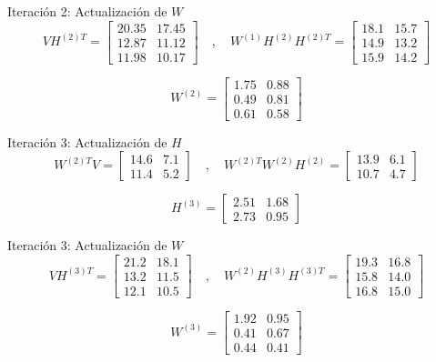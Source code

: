 \documentclass{beamer}
\begin{document}
\begin{frame}{Iteración 2: Actualización de \( W \)}
\[
V H^{(2)T} = \begin{bmatrix}
20.35 & 17.45 \\
12.87 & 11.12 \\
11.98 & 10.17
\end{bmatrix}
\quad , \quad
W^{(1)} H^{(2)} H^{(2)T} = \begin{bmatrix}
18.1 & 15.7 \\
14.9 & 13.2 \\
15.9 & 14.2
\end{bmatrix}
\]

\[
W^{(2)} = \begin{bmatrix}
1.75 & 0.88 \\
0.49 & 0.81 \\
0.61 & 0.58
\end{bmatrix}
\]
\end{frame}

\begin{frame}{Iteración 3: Actualización de \( H \)}
\[
W^{(2)T} V = \begin{bmatrix}
14.6 & 7.1 \\
11.4 & 5.2
\end{bmatrix}
\quad , \quad
W^{(2)T} W^{(2)} H^{(2)} = \begin{bmatrix}
13.9 & 6.1 \\
10.7 & 4.7
\end{bmatrix}
\]

\[
H^{(3)} = \begin{bmatrix}
2.51 & 1.68 \\
2.73 & 0.95
\end{bmatrix}
\]
\end{frame}

\begin{frame}{Iteración 3: Actualización de \( W \)}
\[
V H^{(3)T} = \begin{bmatrix}
21.2 & 18.1 \\
13.2 & 11.5 \\
12.1 & 10.5
\end{bmatrix}
\quad , \quad
W^{(2)} H^{(3)} H^{(3)T} = \begin{bmatrix}
19.3 & 16.8 \\
15.8 & 14.0 \\
16.8 & 15.0
\end{bmatrix}
\]

\[
W^{(3)} = \begin{bmatrix}
1.92 & 0.95 \\
0.41 & 0.67 \\
0.44 & 0.41
\end{bmatrix}
\]
\end{frame}
\end{document}
